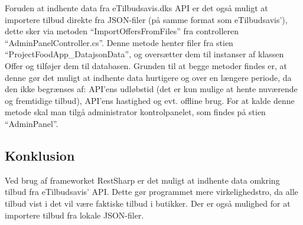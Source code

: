 Foruden at indhente data fra eTilbudsavis.dks API er det også muligt at importere tilbud direkte fra JSON-filer (på samme format som eTilbudsavis'), dette sker via metoden ``ImportOffersFromFiles'' fra controlleren ``AdminPanelController.cs''.
Denne metode henter filer fra stien ``ProjectFood\/App\_Data\/jsonData\/'', og oversætter dem til instanser af klassen Offer og tilføjer dem til databasen. 
Grunden til at begge metoder findes er, at denne gør det muligt at indhente data hurtigere og over en længere periode, da den ikke begrænses af: API'ens udløbstid (det er kun mulige at hente nuværende og fremtidige tilbud), API'ens hastighed og evt. offline brug. 
For at kalde denne metode skal man tilgå administrator kontrolpanelet, som findes på stien ``\/AdminPanel''.
\subsection{Konklusion} 
Ved brug af frameworket RestSharp er det muligt at indhente data omkring tilbud fra eTilbudsavis' API. 
Dette gør programmet mere virkelighedstro, da alle tilbud vist i det vil være faktiske tilbud i butikker.
Der er også mulighed for at importere tilbud fra lokale JSON-filer. 
